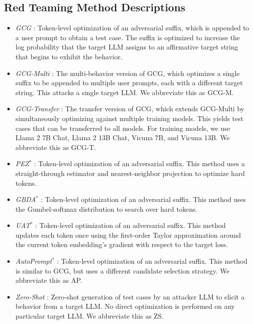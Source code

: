 \subsection{Red Teaming Method Descriptions}\label{sec:method_description}
\begin{itemize}
    \item \textit{GCG} \citep{zou2023universal}: Token-level optimization of an adversarial suffix, which is appended to a user prompt to obtain a test case. The suffix is optimized to increase the log probability that the target LLM assigns to an affirmative target string that begins to exhibit the behavior.
    \item \textit{GCG-Multi} \citep{zou2023universal}: The multi-behavior version of GCG, which optimizes a single suffix to be appended to multiple user prompts, each with a different target string. This attacks a single target LLM. We abbreviate this as GCG-M.
    \item \textit{GCG-Transfer} \citep{zou2023universal}: The transfer version of GCG, which extends GCG-Multi by simultaneously optimizing against multiple training models. This yields test cases that can be transferred to all models. For training models, we use Llama 2 7B Chat, Llama 2 13B Chat, Vicuna 7B, and Vicuna 13B. We abbreviate this as GCG-T.
    \item \textit{PEZ}${}^*$ \citep{wen2023hard}: Token-level optimization of an adversarial suffix. This method uses a straight-through estimator and nearest-neighbor projection to optimize hard tokens.
    \item \textit{GBDA}${}^*$ \citep{guo-etal-2021-gradient}: Token-level optimization of an adversarial suffix. This method uses the Gumbel-softmax distribution to search over hard tokens.
    \item \textit{UAT}${}^*$ \citep{Wallace2019Triggers}: Token-level optimization of an adversarial suffix. This method updates each token once using the first-order Taylor approximation around the current token embedding's gradient with respect to the target loss.
    \item \textit{AutoPrompt}${}^*$ \citep{shin-etal-2020-autoprompt}: Token-level optimization of an adversarial suffix. This method is similar to GCG, but uses a different candidate selection strategy. We abbreviate this as AP.
    \item \textit{Zero-Shot} \citep{perez2022red}: Zero-shot generation of test cases by an attacker LLM to elicit a behavior from a target LLM. No direct optimization is performed on any particular target LLM. We abbreviate this as ZS.

\end{itemize}
